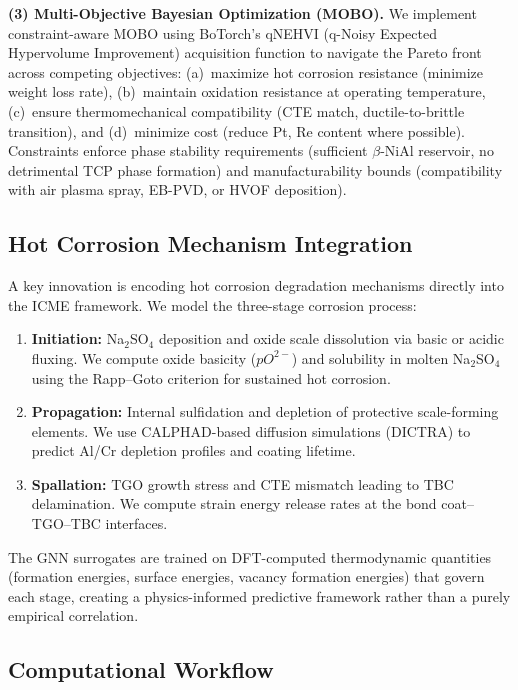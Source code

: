 \documentclass[11pt,letterpaper]{article}
\begin{document}
\textbf{(3) Multi-Objective Bayesian Optimization (MOBO).}
We implement constraint-aware MOBO using BoTorch's qNEHVI (q-Noisy Expected Hypervolume Improvement) acquisition function to navigate the Pareto front across competing objectives: (a)~maximize hot corrosion resistance (minimize weight loss rate), (b)~maintain oxidation resistance at operating temperature, (c)~ensure thermomechanical compatibility (CTE match, ductile-to-brittle transition), and (d)~minimize cost (reduce Pt, Re content where possible). Constraints enforce phase stability requirements (sufficient $\beta$-NiAl reservoir, no detrimental TCP phase formation) and manufacturability bounds (compatibility with air plasma spray, EB-PVD, or HVOF deposition).

\subsection{Hot Corrosion Mechanism Integration}

A key innovation is encoding hot corrosion degradation mechanisms directly into the ICME framework. We model the three-stage corrosion process:

\begin{enumerate}[nosep]
  \item \textbf{Initiation:} Na$_2$SO$_4$ deposition and oxide scale dissolution via basic or acidic fluxing. We compute oxide basicity ($pO^{2-}$) and solubility in molten Na$_2$SO$_4$ using the Rapp--Goto criterion for sustained hot corrosion.
  \item \textbf{Propagation:} Internal sulfidation and depletion of protective scale-forming elements. We use CALPHAD-based diffusion simulations (DICTRA) to predict Al/Cr depletion profiles and coating lifetime.
  \item \textbf{Spallation:} TGO growth stress and CTE mismatch leading to TBC delamination. We compute strain energy release rates at the bond coat--TGO--TBC interfaces.
\end{enumerate}

The GNN surrogates are trained on DFT-computed thermodynamic quantities (formation energies, surface energies, vacancy formation energies) that govern each stage, creating a physics-informed predictive framework rather than a purely empirical correlation.

\subsection{Computational Workflow}
\end{document}
